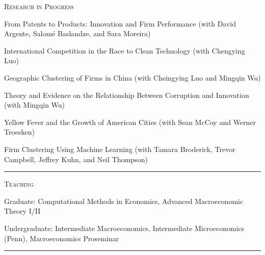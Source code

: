 \documentclass{article}
\begin{document}
\parbox{\textwidth}{
\parbox[t]{0.28\textwidth}{ \raggedright \noindent \textsc{ Research in Progress } }
\parbox[t]{0.72\textwidth}{ \raggedright

From Patents to Products: Innovation and Firm Performance (with David Argente, Salomé Baslandze, and Sara Moreira)
\vspace{0.27cm}

International Competition in the Race to Clean Technology (with Chengying Luo)
\vspace{0.27cm}

Geographic Clustering of Firms in China (with Cheingying Luo and Mingqin Wu)
\vspace{0.27cm}

Theory and Evidence on the Relationship Between Corruption and Innovation (with Mingqin Wu)
\vspace{0.27cm}

Yellow Fever and the Growth of American Cities (with Sean McCoy and Werner Troesken)
\vspace{0.27cm}

Firm Clustering Using Machine Learning (with Tamara Broderick, Trevor Campbell, Jeffrey Kuhn, and Neil Thompson)
\vspace{0.27cm}

}
\textcolor{light-gray}{\hrule}
}
\vspace{0.3cm}

\parbox{\textwidth}{
\parbox[t]{0.28\textwidth}{ \raggedright \noindent \textsc{ Teaching } }
\parbox[t]{0.72\textwidth}{ \raggedright

Graduate: Computational Methods in Economics, Advanced Macroeconomic Theory I/II
\vspace{0.27cm}

Undergraduate: Intermediate Macroeconomics, Intermediate Microeconomics (Penn), Macroeconomics Proseminar
\vspace{0.27cm}

}
\textcolor{light-gray}{\hrule}
}
\vspace{0.3cm}
\end{document}

